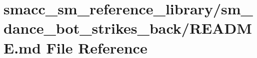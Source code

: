 \hypertarget{smacc__sm__reference__library_2sm__dance__bot__strikes__back_2README_8md}{}\section{smacc\+\_\+sm\+\_\+reference\+\_\+library/sm\+\_\+dance\+\_\+bot\+\_\+strikes\+\_\+back/\+R\+E\+A\+D\+ME.md File Reference}
\label{smacc__sm__reference__library_2sm__dance__bot__strikes__back_2README_8md}
